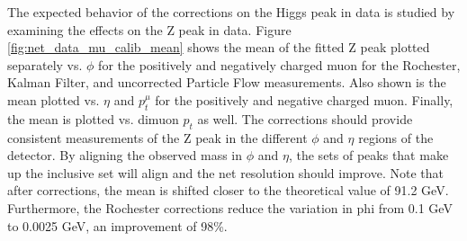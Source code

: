The expected behavior of the corrections on the Higgs peak in data is studied by examining the effects on the Z peak in data. Figure \ref{fig:net_data_mu_calib_mean} shows the mean of the fitted Z peak plotted separately vs. $\phi$ for the positively and negatively charged muon for the Rochester, Kalman Filter, and uncorrected Particle Flow measurements. Also shown is the mean plotted  vs. $\eta$ and $p_{t}^\mu$ for the positively and negative charged muon. Finally, the mean is plotted vs. dimuon $p_t$ as well. The corrections should provide consistent measurements of the Z peak in the different $\phi$ and $\eta$ regions of the detector. By aligning the observed mass in $\phi$ and $\eta$, the sets of peaks that make up the inclusive set will align and the net resolution should improve. Note that after corrections, the mean is shifted closer to the theoretical value of 91.2 GeV. Furthermore, the Rochester corrections reduce the variation in phi from 0.1 GeV to 0.0025 GeV, an improvement of 98\%.
